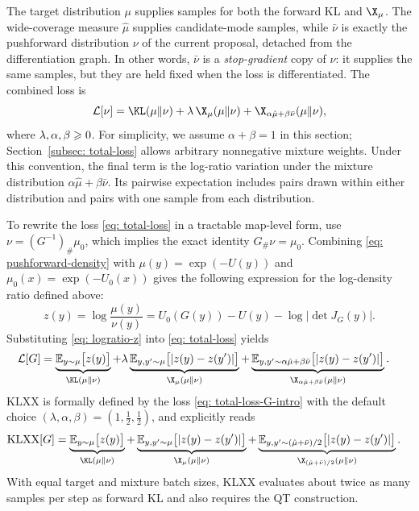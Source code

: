 \documentclass{article}
\begin{document}
The target distribution $\mu$ supplies samples for both the forward KL and $\X_\mu$. The wide-coverage measure $\hat\mu$ supplies candidate-mode samples, while $\bar\nu$ is exactly the pushforward distribution $\nu$ of the current proposal, detached from the differentiation graph. In other words, $\bar\nu$ is a \emph{stop-gradient} copy of $\nu$: it supplies the same samples, but they are held fixed when the loss is differentiated. The combined loss is
\begin{equation}
    \mathcal{L}[\nu] = \KL(\mu\|\nu) + \lambda\, \X_\mu(\mu\|\nu) + \X_{\alpha\hat\mu + \beta\bar\nu}(\mu\|\nu),
    \label{eq: total-loss}
\end{equation}
where $\lambda,\alpha,\beta\geqslant0$. For simplicity, we assume $\alpha+\beta=1$ in this section; Section~\ref{subsec: total-loss} allows arbitrary nonnegative mixture weights. Under this convention, the final term is the log-ratio variation under the mixture distribution $\alpha\hat\mu+\beta\bar\nu$. Its pairwise expectation includes pairs drawn within either distribution and pairs with one sample from each distribution.

To rewrite the loss \eqref{eq: total-loss} in a tractable map-level form, use $\nu=(G^{-1})_{\#}\mu_0$, which implies the exact identity $G_{\#}\nu=\mu_0$. Combining \eqref{eq: pushforward-density} with $\mu(y)=\exp(-U(y))$ and $\mu_0(x)=\exp(-U_0(x))$ gives the following expression for the log-density ratio defined above:
\begin{equation}
    z(y)=\log\frac{\mu(y)}{\nu(y)} = U_0(G(y)) - U(y) - \log|\det J_G(y)|.
    \label{eq: logratio-z}
\end{equation}
Substituting \eqref{eq: logratio-z} into \eqref{eq: total-loss} yields
\begin{align}
    \mathcal{L}[G]
    &= \underbrace{\mathbb{E}_{y \sim \mu}\bigl[z(y)\bigr]}_{\KL(\mu\|\nu)}
     + \lambda \underbrace{\mathbb{E}_{y, y' \sim \mu}\bigl[|z(y) - z(y')|\bigr]}_{\X_\mu(\mu\|\nu)}
     + \underbrace{\mathbb{E}_{y, y' \sim \alpha\hat\mu + \beta\bar\nu}\bigl[|z(y) - z(y')|\bigr]}_{\X_{\alpha\hat\mu + \beta\bar\nu}(\mu\|\nu)} .
    \label{eq: total-loss-G-intro}
\end{align}
KLXX is formally defined by the loss \eqref{eq: total-loss-G-intro} with the default choice $(\lambda,\alpha,\beta)=(1,\frac12,\frac12)$, and explicitly reads
\begin{align}
    \mathrm{KLXX}[G]
    &= \underbrace{\mathbb{E}_{y \sim \mu}\bigl[z(y)\bigr]}_{\KL(\mu\|\nu)}
     + \underbrace{\mathbb{E}_{y, y' \sim \mu}\bigl[|z(y) - z(y')|\bigr]}_{\X_\mu(\mu\|\nu)}
     + \underbrace{\mathbb{E}_{y, y' \sim (\hat\mu + \bar\nu)/2}\bigl[|z(y) - z(y')|\bigr]}_{\X_{(\hat\mu + \bar\nu)/2}(\mu\|\nu)} .
    \label{eq: KLXX-G-intro}
\end{align}
With equal target and mixture batch sizes, KLXX evaluates about twice as many samples per step as forward KL and also requires the QT construction.
\end{document}
